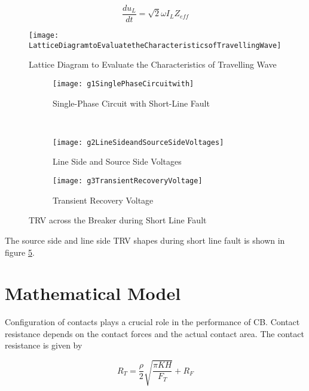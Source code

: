 \begin{equation}\label{eq:3.11}
\frac{d u_L}{dt} = \sqrt{2} \omega I_L Z_{eff}
\end{equation}

\begin{figure}[!htbp]
    \centering
    \texttt{[image: LatticeDiagramtoEvaluatetheCharacteristicsofTravellingWave]}
    \caption{Lattice Diagram to Evaluate the Characteristics of Travelling Wave}
    \label{fig:Lattice Diagram to Evaluate the Characteristics of Travelling Wave}
\end{figure}

\begin{figure}
    \centering
    \begin{subfigure}[b]{0.5\textwidth}
        \centering
        \texttt{[image: g1SinglePhaseCircuitwith]}
        \caption{Single-Phase Circuit with Short-Line Fault}
        \label{fig:Single-Phase Circuit with Short-Line Fault}
    \end{subfigure}
    \\
    \begin{subfigure}[b]{0.49\textwidth}
        \centering
        \texttt{[image: g2LineSideandSourceSideVoltages]}
        \caption{Line Side and Source Side Voltages}
        \label{fig:Line Side and Source Side Voltages}
    \end{subfigure}
    \begin{subfigure}[b]{0.49\textwidth}
        \centering
        \texttt{[image: g3TransientRecoveryVoltage]}
        \caption{Transient Recovery Voltage}
        \label{fig:Transient Recovery Voltage}
    \end{subfigure}
    \caption{TRV across the Breaker during Short Line Fault}
    \label{fig:TRV across the Breaker during Short Line Fault}
\end{figure}
The source side and line side TRV shapes during short line fault is shown in figure \ref{fig:TRV across the Breaker during Short Line Fault}.

\clearpage
\section{Mathematical Model}
Configuration of contacts plays a crucial role in the performance of CB. Contact resistance depends on the contact forces and the actual contact area. The contact resistance is given by

\begin{equation}
R_T = \frac{\rho}{2} \sqrt{\frac{\pi K H }{F_T}} + R_F
\end{equation}

